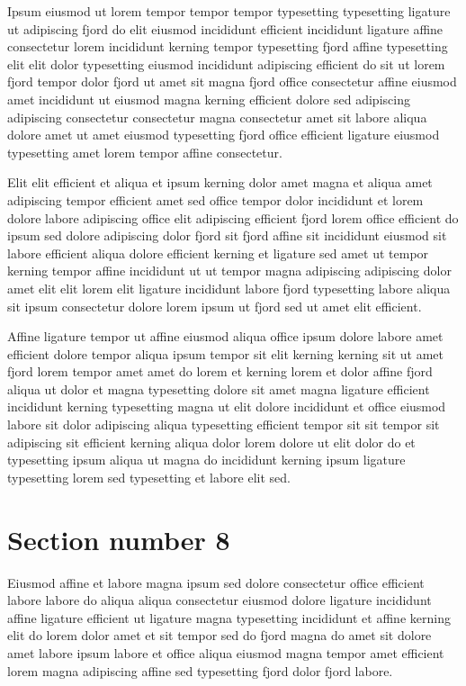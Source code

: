 \documentclass[11pt]{article}
\begin{document}
Ipsum eiusmod ut lorem tempor tempor tempor typesetting typesetting ligature ut adipiscing fjord do elit eiusmod incididunt efficient incididunt ligature affine consectetur lorem incididunt kerning tempor typesetting fjord affine typesetting elit elit dolor typesetting eiusmod incididunt adipiscing efficient do sit ut lorem fjord tempor dolor fjord ut amet sit magna fjord office consectetur affine eiusmod amet incididunt ut eiusmod magna kerning efficient dolore sed adipiscing adipiscing consectetur consectetur magna consectetur amet sit labore aliqua dolore amet ut amet eiusmod typesetting fjord office efficient ligature eiusmod typesetting amet lorem tempor affine consectetur.

Elit elit efficient et aliqua et ipsum kerning dolor amet magna et aliqua amet adipiscing tempor efficient amet sed office tempor dolor incididunt et lorem dolore labore adipiscing office elit adipiscing efficient fjord lorem office efficient do ipsum sed dolore adipiscing dolor fjord sit fjord affine sit incididunt eiusmod sit labore efficient aliqua dolore efficient kerning et ligature sed amet ut tempor kerning tempor affine incididunt ut ut tempor magna adipiscing adipiscing dolor amet elit elit lorem elit ligature incididunt labore fjord typesetting labore aliqua sit ipsum consectetur dolore lorem ipsum ut fjord sed ut amet elit efficient.

Affine ligature tempor ut affine eiusmod aliqua office ipsum dolore labore amet efficient dolore tempor aliqua ipsum tempor sit elit kerning kerning sit ut amet fjord lorem tempor amet amet do lorem et kerning lorem et dolor affine fjord aliqua ut dolor et magna typesetting dolore sit amet magna ligature efficient incididunt kerning typesetting magna ut elit dolore incididunt et office eiusmod labore sit dolor adipiscing aliqua typesetting efficient tempor sit sit tempor sit adipiscing sit efficient kerning aliqua dolor lorem dolore ut elit dolor do et typesetting ipsum aliqua ut magna do incididunt kerning ipsum ligature typesetting lorem sed typesetting et labore elit sed.

\section{Section number 8}\label{sec:s8}
Eiusmod affine et labore magna ipsum sed dolore consectetur office efficient labore labore do aliqua aliqua consectetur eiusmod dolore ligature incididunt affine ligature efficient ut ligature magna typesetting incididunt et affine kerning elit do lorem dolor amet et sit tempor sed do fjord magna do amet sit dolore amet labore ipsum labore et office aliqua eiusmod magna tempor amet efficient lorem magna adipiscing affine sed typesetting fjord dolor fjord labore.
\end{document}
